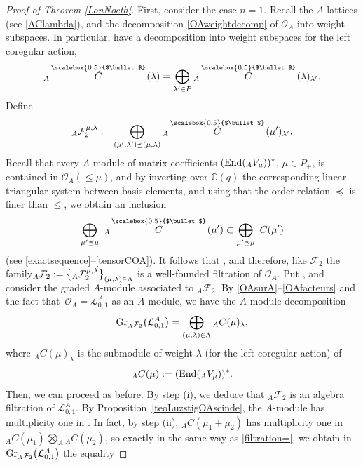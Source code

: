 \documentclass[10pt,a4paper]{amsart}
\numberwithin{equation}{section}
\theoremstyle{definition}
\newcommand{\mc}{\mathbb{C}}
\newcommand{\Ll}{{\mathcal L}}
\newcommand{\Oo}{{\mathcal O}}
\newcommand{\smallbullet}{%
\vcenter{\hbox{\,\scalebox{0.5}{$\bullet$}\,}}
}
\begin{document}
\begin{proof}[Proof of Theorem \ref{LonNoeth}]
First, consider the case $n=1$. Recall the $A$-lattices \smash{${}_A \overset{\raisebox{-1.5pt}{\scriptsize$\smallbullet$}}{C} (\lambda)$} (see \eqref{AClambda}), and the decomposition \eqref{OAweightdecomp} of $\Oo_A$ into weight subspaces. In particular, have a decomposition into weight subspaces for the left coregular action,
\[{}_A \overset{\raisebox{-1.5pt}{\scriptsize$\smallbullet$}}{C} (\lambda) = \bigoplus_{\lambda'\in P} {}_A \overset{\raisebox{-1.5pt}{\scriptsize$\smallbullet$}}{C} (\lambda)_{\lambda'}.\]
Define
\[{}_A\mathcal{F}_2^{\mu,\lambda} := \bigoplus_{(\mu',\lambda')\preceq (\mu,\lambda)} {}_A \overset{\raisebox{-1.5pt}{\scriptsize$\smallbullet$}}{C} (\mu')_{\lambda'}.\]
Recall that every $A$-module of matrix coefficients $({\rm End}({}_A V_\mu))^*$, $\mu\in P_+$, is contained in $\Oo_A(\leq \mu)$, and by inverting over $\mc(q)$ the corresponding linear triangular system between basis elements, and using that the order relation $\preceq$ is finer than $\leq$, we obtain an inclusion
\[
 \bigoplus_{\mu'\preceq \mu}\ {}_A \overset{\raisebox{-1.5pt}{\scriptsize$\smallbullet$}}{C} (\mu') \subset \bigoplus_{\mu'\preceq \mu} \ C(\mu')
\]
 (see \eqref{exactsequence}--\eqref{tensorCOA}). It follows that \smash{${}_A\mathcal{F}_2^{\mu,\lambda} = \mathcal{F}_2^{\mu,\lambda} \cap \Oo_A$}, and therefore, like $\mathcal{F}_2$ the family${}_A\mathcal{F}_2 :=\smash{\big\{{}_A\mathcal{F}_2^{\mu,\lambda}\big\}_{(\mu,\lambda)\in \Lambda}}$ is a well-founded filtration of $\Oo_A$. Put \smash{${}_A\mathcal{F}_2^{\prec \mu,\lambda} = \mathcal{F}_2^{\prec \mu,\lambda} \cap \Oo_A$}, and consider the graded $A$-module  associated to ${}_A\mathcal{F}_2$. By \eqref{OAsurA}--\eqref{OAfacteurs} and the fact that~${\Oo_A=\Ll_{0,1}^A}$ as an $A$-module, we have the $A$-module decomposition
\[{\rm Gr}_{ {}_A\mathcal{F}_2}\big({\mathcal L}_{0,1}^A\big)=\bigoplus_{(\mu,\lambda)\in \Lambda} {}_AC(\mu)_\lambda,\]
where ${}_AC(\mu)_\lambda$ is the submodule of weight $\lambda$ (for the left coregular action) of
\[{}_AC(\mu) := \left({\rm End}({}_A V_\mu\right))^*.\]
Then, we can proceed as before. By step (i), we deduce that ${}_A\mathcal{F}_2$ is an algebra filtration of $\Ll_{0,1}^A$. By Proposition~\ref{teoLuzstigOAscinde}, the $A$-module \smash{${}_A \overset{\raisebox{-1.5pt}{\scriptsize$\smallbullet$}}{C} (\mu_1+\mu_2)$} has multiplicity one in \smash{${}_A \overset{\raisebox{-1.5pt}{\scriptsize$\smallbullet$}}{C} (\mu_1)\otimes {}_A \overset{\raisebox{-1.5pt}{\scriptsize$\smallbullet$}}{C} (\mu_2)$}. In fact, by step (ii), ${}_AC(\mu_1+\mu_2)$ has multiplicity one in ${}_AC(\mu_1) \bigotimes_A {}_AC(\mu_2)$, so exactly in the same way as \eqref{filtration=}, we obtain in ${\rm Gr}_{ {}_A\mathcal{F}_2}\big({\mathcal L}_{0,1}^A\big)$ the equality

\end{proof}
\end{document}
